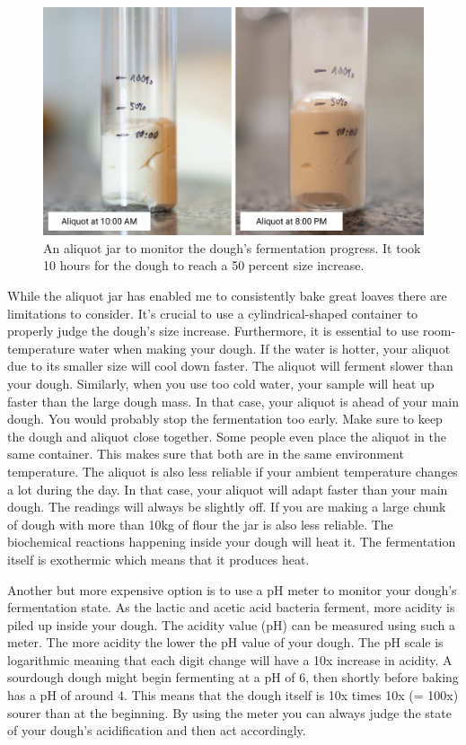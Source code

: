 \begin{figure}[!htb]
  \includegraphics[width=\textwidth]{aliquot-before-after}
  \caption{An aliquot jar to monitor the dough's fermentation progress.
  It took 10 hours for the dough to reach a 50 percent size increase.}
\end{figure}

While the aliquot jar has enabled me to consistently bake
great loaves there are limitations to consider. It's crucial
to use a cylindrical-shaped container to properly judge
the dough's size increase. Furthermore, it is essential
to use room-temperature water when making your dough. If the
water is hotter, your aliquot due to its smaller size
will cool down faster. The aliquot will ferment slower
than your dough. Similarly, when you use too cold water,
your sample will heat up faster than the large dough mass.
In that case, your aliquot is ahead of your main dough. You
would probably stop the fermentation too early. Make sure
to keep the dough and aliquot close together. Some people even
place the aliquot in the same container. This makes sure that
both are in the same environment temperature. The aliquot
is also less reliable if your ambient temperature changes
a lot during the day. In that case, your aliquot will adapt
faster than your main dough. The readings will always be slightly
off. If you are making a large chunk of dough with more
than 10kg of flour the jar is also less reliable. The biochemical
reactions happening inside your dough will heat it.
The fermentation itself is exothermic which means
that it produces heat.

Another but more expensive option is to use a pH meter
to monitor your dough's fermentation state. As the lactic
and acetic acid bacteria ferment, more acidity is piled
up inside your dough. The acidity value (pH) can be
measured using such a meter. The more acidity the lower the pH
value of your dough. The pH scale is logarithmic meaning
that each digit change will have a 10x increase in acidity.
A sourdough dough might begin fermenting at a pH of 6,
then shortly before baking has a pH of around 4. This means
that the dough itself is 10x times 10x (= 100x) sourer
than at the beginning. By using the meter you can always
judge the state of your dough's acidification and then act
accordingly.

